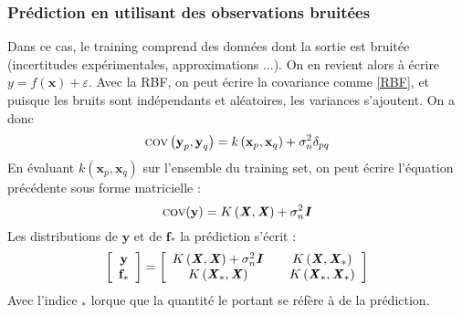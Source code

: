 \documentclass[a4paper,12pt]{report}
\newcommand{\bepar}[1]{
	\left( #1 \right)  
}
\numberwithin{equation}{section} %
\begin{document}
\subsubsection*{Prédiction en utilisant des observations bruitées}
Dans ce cas, le training comprend des données dont la sortie est bruitée (incertitudes expérimentales, approximations ...). On en revient alors à écrire $y = f(\textbf{x}) + \varepsilon$. Avec la RBF, on peut écrire la covariance comme \eqref{RBF}, et puisque les bruits sont indépendants et aléatoires, les variances s'ajoutent. On a donc 
\begin{equation*}
\textsc{cov}\bepar{\textbf{y}_p, \textbf{y}_q} = k\bepar{\textbf{x}_p, \textbf{x}_q} + \sigma_n^2 \delta_{pq}
\end{equation*}
En évaluant $k\bepar{\textbf{x}_p, \textbf{x}_q}$ sur l'ensemble du training set, on peut écrire l'équation précédente sous forme matricielle :
\begin{equation}
\textsc{cov}(\textbf{y}) = K\bepar{\textbf{\textit{X}}, \textbf{\textit{X}}} + \sigma_n^2\textbf{\textit{I}}
\end{equation}
Les distributions de $\textbf{y}$ et de $\textbf{f}_*$ la prédiction s'écrit :
\begin{equation}
\left[ \begin{array}{c} 
 \textbf{y} \\ \textbf{f}_* \end{array}
\right] = \left[\begin{array}{c@{\qquad}c} K\left(\textbf{\textit{X}}, \textbf{\textit{X}}\right) + \sigma_n^2\textbf{\textit{I}}& K\bepar{\textbf{\textit{X}}, \textbf{\textit{X}}_*}\\ K\bepar{\textbf{\textit{X}}_*, \textbf{\textit{X}}} & K\bepar{\textbf{\textit{X}}_*, \textbf{\textit{X}}_*}\\  \end{array}\right]
\end{equation}
Avec l'indice $_*$ lorque que la quantité le portant se réfère à de la prédiction.\\
\end{document}
